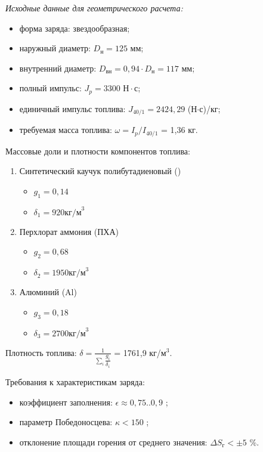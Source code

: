 \emph{Исходные данные для геометрического расчета:}
\begin{itemize}
	\item форма заряда:					звездообразная;
	\item наружный диаметр: 				$D_\text{н}=125$ мм;
	\item внутренний диаметр:				$D_\text{вн}=0,94 \cdot D_\text{н}=117$ мм;
	\item полный импульс:					$J_p=3300 \text{ Н} \cdot \text{с} $;
	\item единичный импульс топлива:		$J_\text{40/1}=2424,29$ (Н$\cdot$с)/кг;
	\item требуемая масса топлива:          $\omega = I_p/I_\text{40/1}$  = 1,36 кг.
\end{itemize}
Массовые доли и плотности компонентов топлива:
\begin{enumerate}
	\item Синтетический каучук полибутадиеновый ()	
		\begin{itemize}
			\item $g_1=0,14$		
			\item $\delta_1=920 \text{кг/м}^3$ 
		\end{itemize}
	\item Перхлорат аммония (ПХА)	
		\begin{itemize}
			\item $g_2=0,68$		
			\item $\delta_2=1950 \text{кг/м}^3$ 
		\end{itemize}
	\item Алюминий (Al)			
		\begin{itemize}
			\item $g_3=0,18$		
			\item $\delta_3=2700 \text{кг/м}^3$ 
		\end{itemize}
\end{enumerate}

Плотность топлива:				$\delta = \frac{1} {\sum_i{\dfrac{g_i}{\delta_i}}}	 $ = 1761,9   кг/$\text{м}^3$. 

Требования к характеристикам заряда:
\begin{itemize}
	\item коэффициент заполнения:					$\epsilon \approx 0,75..0,9$ ;
	\item параметр Победоносцева:					$\kappa<150$ ;
	\item отклонение площади горения от среднего значения:	$\Delta S_\text{г}< \pm 5 $ \%.
\end{itemize}

